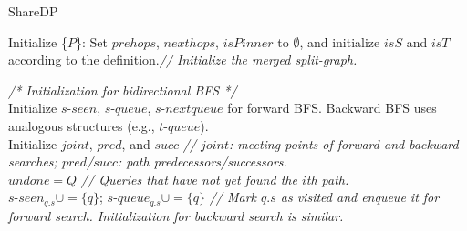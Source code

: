 \begin{algorithm}[t]
    \caption{ShareDP}
    \label{alg:shareDP}
    
    Initialize \{$P$\}: Set $prehops$, $nexthops$, $isPinner$ to $\emptyset$, and initialize $isS$ and $isT$ according to the definition.\textit{\color{gray}// Initialize the merged split-graph. } \\
    {
        \textit{\color{blue}/* Initialization for bidirectional BFS */} \\
        Initialize $s$-$seen$, $s$-$queue$, $s$-$nextqueue$ for forward BFS. Backward BFS uses analogous structures (e.g., $t$-$queue$). \\
        Initialize $joint$, $pred$, and $succ$ \textit{\color{gray}// $joint$: meeting points of forward and backward searches; $pred$/$succ$: path predecessors/successors.} \\
        $undone = Q$ \textit{\color{gray}// Queries that have not yet found the $i$th path.} \\
        
        {
            $s$-$seen_{q.s} \cup= \{q\}$; $s$-$queue_{q.s} \cup= \{q\}$ \textit{\color{gray}// Mark $q.s$ as visited and enqueue it for forward search. Initialization for backward search is similar.} \\
        }

}
\end{algorithm}

